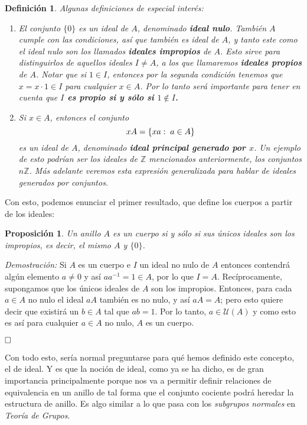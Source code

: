 \documentclass[12pt]{article}
\newtheorem{proposition}[theorem]{Proposición}
\newtheorem{definition}[theorem]{Definición}
\begin{document}
\begin{definition} Algunas definiciones de especial interés: \renewcommand{\labelenumi}{\arabic{enumi}.} \begin{enumerate}
\item El conjunto $\lbrace 0 \rbrace$ es un ideal de $A$, denominado \textbf{ideal nulo}. También $A$ cumple con las condiciones, así que también es ideal de $A$, y tanto este como el ideal nulo son los llamados \textbf{ideales impropios} de $A$. Esto sirve para distinguirlos de aquellos ideales $I \neq A$, a los que llamaremos \textbf{ideales propios} de $A$. Notar que si $1 \in I$, entonces por la segunda condición tenemos que $x = x \cdot 1 \in I$ para cualquier $x \in A$. Por lo tanto será importante para tener en cuenta que \textbf{$I$ es propio si y sólo si $1 \notin I$.}
\item Si $x \in A$, entonces el conjunto $$xA = \lbrace xa : \hspace{0.1cm} a \in A \rbrace$$ es un ideal de $A$, denominado \textbf{ideal principal generado por $x$}. Un ejemplo de esto podrían ser los ideales de $\mathbb{Z}$ mencionados anteriormente, los conjuntos $n\mathbb{Z}$. Más adelante veremos esta expresión generalizada para hablar de ideales generados por conjuntos. 
\end{enumerate}
\end{definition}

Con esto, podemos enunciar el primer resultado, que define los cuerpos a partir de los ideales:

\begin{proposition} Un anillo $A$ es un cuerpo si y sólo si sus únicos ideales son los impropios, es decir, el mismo $A$ y $\lbrace 0 \rbrace$.
\end{proposition}
\emph{Demostración: } Si $A$ es un cuerpo e $I$ un ideal no nulo de $A$ entonces contendrá algún elemento $a \neq 0$ y así $aa^{-1} = 1 \in A$, por lo que $I = A$. Recíprocamente, supongamos que los únicos ideales de $A$ son los impropios. Entonces, para cada $a \in A$ no nulo el ideal $aA$ también es no nulo, y así $aA = A$; pero esto quiere decir que existirá un $b \in A$ tal que $ab = 1$. Por lo tanto, $a \in \mathcal{U}(A)$ y como esto es así para cualquier $a \in A$ no nulo, $A$ es un cuerpo.

$\hfill \square$

Con todo esto, sería normal preguntarse para qué hemos definido este concepto, el de ideal. Y es que la noción de ideal, como ya se ha dicho, es de gran importancia principalmente porque nos va a permitir definir relaciones de equivalencia en un anillo de tal forma que el conjunto cociente podrá heredar la estructura de anillo. Es algo similar a lo que pasa con los \textit{subgrupos normales} en \textit{Teoría de Grupos}.
 
\end{document}
